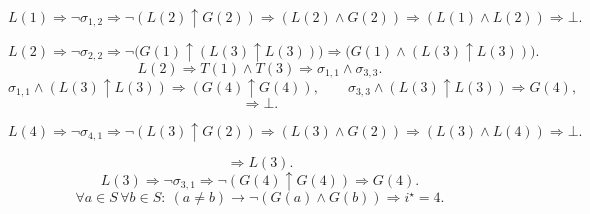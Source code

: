 \[
\boxed{L(1)}
\Rightarrow \neg\sigma_{1,2}
\Rightarrow \neg(L(2)\uparrow G(2))
\Rightarrow (L(2)\land G(2))
\Rightarrow (L(1)\land L(2))
\Rightarrow \bot.
\]

\[
\boxed{L(2)}
\Rightarrow \neg\sigma_{2,2}
\Rightarrow \neg\bigl(G(1)\uparrow(L(3)\uparrow L(3))\bigr)
\Rightarrow \bigl(G(1)\land(L(3)\uparrow L(3))\bigr).
\]
\[
L(2)\Rightarrow T(1)\land T(3)
\Rightarrow \sigma_{1,1}\land \sigma_{3,3}.
\]
\[
\sigma_{1,1}\land (L(3)\uparrow L(3)) \Rightarrow (G(4)\uparrow G(4)),
\qquad
\sigma_{3,3}\land (L(3)\uparrow L(3)) \Rightarrow G(4),
\]
\[
\Rightarrow \bot.
\]

\[
\boxed{L(4)}
\Rightarrow \neg\sigma_{4,1}
\Rightarrow \neg(L(3)\uparrow G(2))
\Rightarrow (L(3)\land G(2))
\Rightarrow (L(3)\land L(4))
\Rightarrow \bot.
\]

\[
\Rightarrow L(3).
\]
\[
L(3)\Rightarrow \neg\sigma_{3,1}
\Rightarrow \neg(G(4)\uparrow G(4))
\Rightarrow G(4).
\]
\[
\forall a\in S\,\forall b\in S:\ (a\neq b)\to\neg(G(a)\land G(b))
\Rightarrow i^\star=4.
\]


\NextPage
